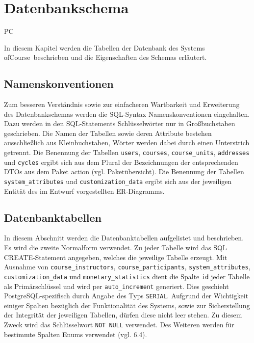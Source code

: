 \chapter{Datenbankschema}

\begin{tiny}
PC
\end{tiny}

In diesem Kapitel werden die Tabellen der Datenbank des Systems \grqq ofCourse\grqq\ beschrieben und die Eigenschaften des Schemas erläutert.

\section{Namenskonventionen}
Zum besseren Verständnis sowie zur einfacheren Wartbarkeit und Erweiterung des Datenbankschemas werden die SQL-Syntax Namenskonventionen eingehalten. Dazu werden in den SQL-Statements Schlüsselwörter nur in Großbuchstaben geschrieben. Die Namen der Tabellen sowie deren Attribute bestehen ausschließlich aus Kleinbuchstaben, Wörter werden dabei durch einen Unterstrich getrennt. Die Benennung der Tabellen \texttt{users}, \texttt{courses}, \texttt{course\_units}, \texttt{addresses} und \texttt{cycles} ergibt sich aus dem Plural der Bezeichnungen der entsprechenden DTOs aus dem Paket action (vgl. Paketübersicht). Die Benennung der Tabellen \texttt{system\_attributes} und \texttt{customization\_data} ergibt sich aus der jeweiligen Entität des im Entwurf vorgestellten ER-Diagramms.

\section{Datenbanktabellen}
In diesem Abschnitt werden die Datenbanktabellen aufgelistet und beschrieben. Es wird die zweite Normalform verwendet. Zu jeder Tabelle wird das SQL CREATE-Statement angegeben, welches die jeweilige Tabelle erzeugt. Mit Ausnahme von \texttt{course\_instructors}, \texttt{course\_participants}, \texttt{system\_attributes}, \texttt{customization\_data} und \texttt{monetary\_statistics} dient die Spalte \texttt{id} jeder Tabelle als Primärschlüssel und wird per \texttt{auto\_increment} generiert. Dies geschieht PostgreSQL-spezifisch durch Angabe des Typs \texttt{SERIAL}. Aufgrund der Wichtigkeit einiger Spalten bezüglich der Funktionalität des Systems, sowie zur Sicherstellung der Integrität der jeweiligen Tabellen, dürfen diese nicht leer stehen. Zu diesem Zweck wird das Schlüsselwort \texttt{NOT NULL} verwendet. Des Weiteren werden für bestimmte Spalten Enums verwendet (vgl. 6.4).

